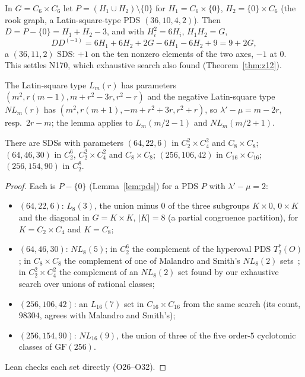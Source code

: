 \begin{example}\label{ex:rook}
In $G = C_6 \times C_6$ let $P = (H_1 \cup H_2) \setminus \{0\}$ for
$H_1 = C_6 \times \{0\}$, $H_2 = \{0\} \times C_6$ (the rook graph, a Latin-square-type PDS
$(36, 10, 4, 2)$). Then $D = P - \{0\} = H_1 + H_2 - 3$, and with $H_i^2 = 6H_i$,
$H_1H_2 = G$,
\[
  DD^{(-1)} = 6H_1 + 6H_2 + 2G - 6H_1 - 6H_2 + 9 = 9 + 2G ,
\]
a $(36, 11, 2)$ SDS: $+1$ on the ten nonzero elements of the two axes, $-1$ at $0$. This settles
N170, which exhaustive search also found (Theorem~\ref{thm:z12}).
\end{example}

The Latin-square type $L_m(r)$ has parameters $(m^2, r(m-1), m + r^2 - 3r, r^2 - r)$ and the
negative Latin-square type $NL_m(r)$ has $(m^2, r(m+1), -m + r^2 + 3r, r^2 + r)$, so
$\lambda' - \mu = m - 2r$, resp.\ $2r - m$; the lemma applies to $L_m(m/2 - 1)$ and
$NL_m(m/2 + 1)$.

\begin{theorem}\label{thm:z14}
There are SDSs with parameters $(64, 22, 6)$ in $C_2^2 \times C_4^2$ and $C_8 \times C_8$;
$(64, 46, 30)$ in $C_2^6$, $C_2^2 \times C_4^2$ and $C_8 \times C_8$; $(256, 106, 42)$ in
$C_{16} \times C_{16}$; $(256, 154, 90)$ in $C_2^8$.
\end{theorem}

\begin{proof}
Each is $P - \{0\}$ (Lemma~\ref{lem:pds}) for a PDS $P$ with $\lambda' - \mu = 2$:
\begin{itemize}
\item $(64, 22, 6)$: $L_8(3)$, the union minus $0$ of the three subgroups $K \times 0$,
  $0 \times K$ and the diagonal in $G = K \times K$, $|K| = 8$ (a partial congruence
  partition), for $K = C_2 \times C_4$ and $K = C_8$;
\item $(64, 46, 30)$: $NL_8(5)$; in $C_2^6$ the complement of the hyperoval PDS $T_2^*(O)$;
  in $C_8 \times C_8$ the complement of one of Malandro and Smith's $NL_8(2)$
  sets~\cite{malandro-smith}; in $C_2^2 \times C_4^2$ the complement of an $NL_8(2)$ set
  found by our exhaustive search over unions of rational classes;
\item $(256, 106, 42)$: an $L_{16}(7)$ set in $C_{16} \times C_{16}$ from the same search (its
  count, $98304$, agrees with Malandro and Smith's);
\item $(256, 154, 90)$: $NL_{16}(9)$, the union of three of the five order-$5$ cyclotomic
  classes of $\mathrm{GF}(256)$.
\end{itemize}
Lean checks each set directly (O26--O32).
\end{proof}

